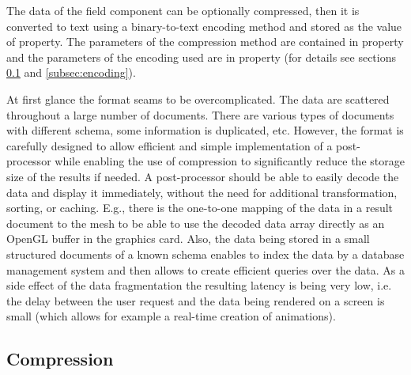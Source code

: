 \begin{itemize}

    The data of the field component can be optionally compressed, then it is converted to text using a binary-to-text encoding method and stored as the value of  property. The parameters of the compression method are contained in  property and the parameters of the encoding used are in  property (for details see sections \ref{subsec:compression} and \ref{subsec:encoding}).

\end{itemize}

At first glance the format seams to be overcomplicated. The data are scattered throughout a large number of documents. There are various types of documents with different schema, some information is duplicated, etc. However, the format is carefully designed to allow efficient and simple implementation of a post-processor while enabling the use of compression to significantly reduce the storage size of the results if needed. A post-processor should be able to easily decode the data and display it immediately, without the need for additional transformation, sorting, or caching. E.g., there is the one-to-one mapping of the data in a result document to the mesh to be able to use the decoded data array directly as an OpenGL buffer in the graphics card. Also, the data being stored in a small structured documents of a known schema enables to index the data by a database management system and then allows to create efficient queries over the data. As a side effect of the data fragmentation the resulting latency is being very low, i.e. the delay between the user request and the data being rendered on a screen is small (which allows for example a real-time creation of animations).


\subsection {Compression}
\label{subsec:compression}

